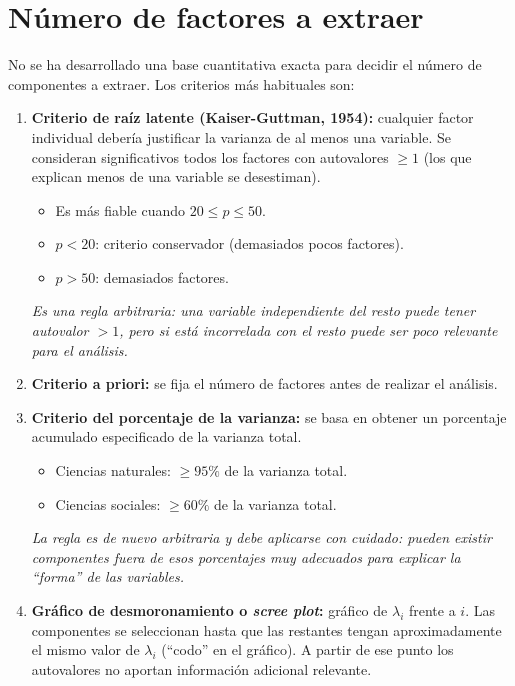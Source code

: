 \documentclass[12pt, a4paper]{article}
\theoremstyle{plain}
\theoremstyle{definition}
\theoremstyle{remark}
\begin{document}
\section{Número de factores a extraer}

No se ha desarrollado una base cuantitativa exacta para decidir el número de
componentes a extraer. Los criterios más habituales son:

\begin{enumerate}[label=\Roman*)]
  \item \textbf{Criterio de raíz latente (Kaiser-Guttman, 1954):} cualquier
        factor individual debería justificar la varianza de al menos una
        variable. Se consideran significativos todos los factores con
        autovalores $\ge1$ (los que explican menos de una variable se
        desestiman).
        \begin{itemize}
          \item Es más fiable cuando $20\le p\le50$.
          \item $p<20$: criterio conservador (demasiados pocos factores).
          \item $p>50$: demasiados factores.
        \end{itemize}
        \emph{Es una regla arbitraria: una variable independiente del resto
        puede tener autovalor $>1$, pero si está incorrelada con el resto puede
        ser poco relevante para el análisis.}

  \item \textbf{Criterio a priori:} se fija el número de factores antes de
        realizar el análisis.

  \item \textbf{Criterio del porcentaje de la varianza:} se basa en obtener
        un porcentaje acumulado especificado de la varianza total.
        \begin{itemize}
          \item Ciencias naturales: $\ge95\%$ de la varianza total.
          \item Ciencias sociales: $\ge60\%$ de la varianza total.
        \end{itemize}
        \emph{La regla es de nuevo arbitraria y debe aplicarse con cuidado:
        pueden existir componentes fuera de esos porcentajes muy adecuados para
        explicar la ``forma'' de las variables.}

  \item \textbf{Gráfico de desmoronamiento o \emph{scree plot}:} gráfico de
        $\lambda_i$ frente a $i$. Las componentes se seleccionan hasta que las
        restantes tengan aproximadamente el mismo valor de $\lambda_i$
        (``codo'' en el gráfico). A partir de ese punto los autovalores no
        aportan información adicional relevante.
\end{enumerate}
\end{document}
